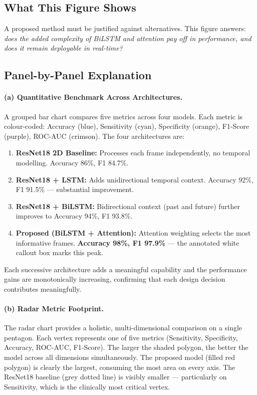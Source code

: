 \documentclass[12pt,a4paper]{article}
\begin{document}
\subsection{What This Figure Shows}

A proposed method must be justified against alternatives. This figure answers: \emph{does the added complexity of BiLSTM and attention pay off in performance, and does it remain deployable in real-time?}

\subsection{Panel-by-Panel Explanation}

\paragraph{(a) Quantitative Benchmark Across Architectures.}
A grouped bar chart compares five metrics across four models. Each metric is colour-coded: Accuracy (blue), Sensitivity (cyan), Specificity (orange), F1-Score (purple), ROC-AUC (crimson). The four architectures are:
\begin{enumerate}[itemsep=2pt]
    \item \textbf{ResNet18 2D Baseline:} Processes each frame independently, no temporal modelling. Accuracy 86\%, F1 84.7\%.
    \item \textbf{ResNet18 + LSTM:} Adds unidirectional temporal context. Accuracy 92\%, F1 91.5\% — substantial improvement.
    \item \textbf{ResNet18 + BiLSTM:} Bidirectional context (past and future) further improves to Accuracy 94\%, F1 93.8\%.
    \item \textbf{Proposed (BiLSTM + Attention):} Attention weighting selects the most informative frames. \textbf{Accuracy 98\%, F1 97.9\%} — the annotated white callout box marks this peak.
\end{enumerate}
Each successive architecture adds a meaningful capability and the performance gains are monotonically increasing, confirming that each design decision contributes meaningfully.

\paragraph{(b) Radar Metric Footprint.}
The radar chart provides a holistic, multi-dimensional comparison on a single pentagon. Each vertex represents one of five metrics (Sensitivity, Specificity, Accuracy, ROC-AUC, F1-Score). The larger the shaded polygon, the better the model across all dimensions simultaneously. The proposed model (filled red polygon) is clearly the largest, consuming the most area on every axis. The ResNet18 baseline (grey dotted line) is visibly smaller — particularly on Sensitivity, which is the clinically most critical vertex.
\end{document}
